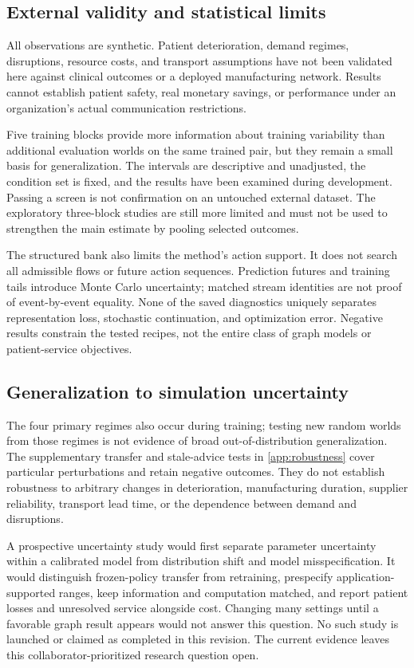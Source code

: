 \documentclass[preprint,12pt]{elsarticle}
\begin{document}
\subsection{External validity and statistical limits}
All observations are synthetic. Patient deterioration, demand regimes,
disruptions, resource costs, and transport assumptions have not been validated
here against clinical outcomes or a deployed manufacturing network. Results
cannot establish patient safety, real monetary savings, or performance under
an organization's actual communication restrictions.

Five training blocks provide more information about training variability than
additional evaluation worlds on the same trained pair, but they remain a small
basis for generalization. The intervals are descriptive and unadjusted, the
condition set is fixed, and the results have been examined during development.
Passing a screen is not confirmation on an untouched external dataset.
The exploratory three-block studies are still more limited and must not be
used to strengthen the main estimate by pooling selected outcomes.

The structured bank also limits the method's action support. It does not search
all admissible flows or future action sequences. Prediction futures and
training tails introduce Monte Carlo uncertainty; matched stream identities
are not proof of event-by-event equality. None of the saved diagnostics uniquely
separates representation loss, stochastic continuation, and optimization error.
Negative results constrain the tested recipes, not the entire class of graph
models or patient-service objectives.

\subsection{Generalization to simulation uncertainty}
The four primary regimes also occur during training; testing new random worlds
from those regimes is not evidence of broad out-of-distribution generalization.
The supplementary transfer and stale-advice tests in
\ref{app:robustness} cover particular perturbations and retain negative outcomes.
They do not establish robustness to arbitrary changes in deterioration,
manufacturing duration, supplier reliability, transport lead time, or the
dependence between demand and disruptions.

A prospective uncertainty study would first separate parameter uncertainty
within a calibrated model from distribution shift and model misspecification.
It would distinguish frozen-policy transfer from retraining, prespecify
application-supported ranges, keep information and computation matched, and
report patient losses and unresolved service alongside cost. Changing many
settings until a favorable graph result appears would not answer this question.
No such study is launched or claimed as completed in this revision. The current
evidence leaves this collaborator-prioritized research question open.
\end{document}
